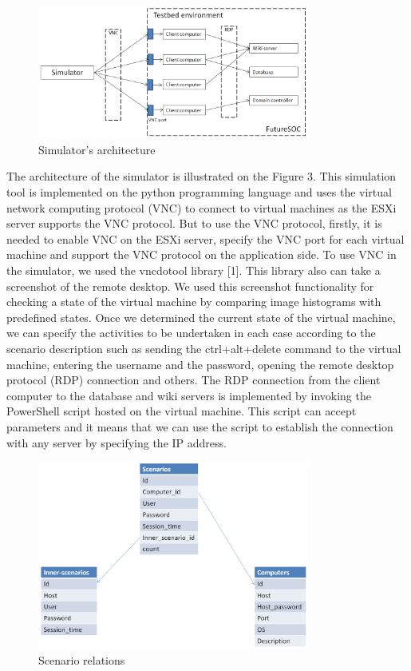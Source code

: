 \begin{figure}[ht!]
\centering
\includegraphics[width=0.8\textwidth]{simulator_architecture.png}
\caption{Simulator's architecture}
\label{overflow}
\end{figure}

The architecture of the simulator is illustrated on the Figure 3. This simulation tool is implemented on the python programming language and uses the virtual network computing protocol (VNC) to connect to virtual machines as the ESXi server supports the VNC protocol. But to use the VNC protocol, firstly, it is needed to enable VNC on the ESXi server, specify the VNC port for each virtual machine and support the VNC protocol on the application side. To use VNC in the simulator, we used the vncdotool library [1]. This library also can take a screenshot of the remote desktop. We used this screenshot functionality for checking a state of the virtual machine by comparing image histograms with predefined states. Once we determined the current state of the virtual machine, we can specify the activities to be undertaken in each case according to the scenario description such as sending the ctrl+alt+delete command to the virtual machine, entering the username and the password, opening the remote desktop protocol (RDP) connection and others. The RDP connection from the client computer to the database and wiki servers is implemented by invoking the PowerShell script hosted on the virtual machine. This script can accept parameters and it means that we can use the script to establish the connection with any server by specifying the IP address.

\begin{figure}[ht!]
\centering
\includegraphics[width=0.8\textwidth]{scenario_relations.png}
\caption{Scenario relations}
\label{overflow}
\end{figure}




